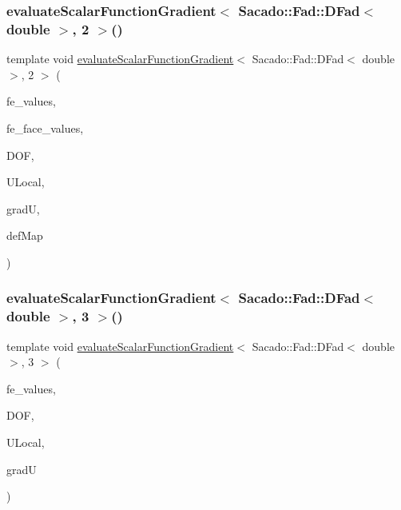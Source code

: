 \subsubsection{\texorpdfstring{evaluate\+Scalar\+Function\+Gradient$<$ Sacado\+::\+Fad\+::\+D\+Fad$<$ double $>$, 2 $>$()}{evaluateScalarFunctionGradient< Sacado::Fad::DFad< double >, 2 >()}\hspace{0.1cm}{\footnotesize\ttfamily [4/4]}}
{\footnotesize\ttfamily template void \mbox{\hyperlink{group___evaluation_functions_gabedd4ae2841d2332ed0df0513b189e34}{evaluate\+Scalar\+Function\+Gradient}}$<$ Sacado\+::\+Fad\+::\+D\+Fad$<$ double $>$, 2 $>$ (\begin{DoxyParamCaption}\item[{const F\+E\+Values$<$ 2 $>$ \&}]{fe\+\_\+values,  }\item[{const F\+E\+Face\+Values$<$ 2 $>$ \&}]{fe\+\_\+face\+\_\+values,  }\item[{unsigned int}]{D\+OF,  }\item[{Table$<$ 1, Sacado\+::\+Fad\+::\+D\+Fad$<$ double $>$$>$ \&}]{U\+Local,  }\item[{Table$<$ 2, Sacado\+::\+Fad\+::\+D\+Fad$<$ double $>$$>$ \&}]{gradU,  }\item[{\mbox{\hyperlink{structdeformation_map}{deformation\+Map}}$<$ Sacado\+::\+Fad\+::\+D\+Fad$<$ double $>$, 2 $>$ \&}]{def\+Map }\end{DoxyParamCaption})}

\mbox{\label{function_evaluations_8cc_a612155392eef7fae67e40615ddfce82a}} 
\subsubsection{\texorpdfstring{evaluate\+Scalar\+Function\+Gradient$<$ Sacado\+::\+Fad\+::\+D\+Fad$<$ double $>$, 3 $>$()}{evaluateScalarFunctionGradient< Sacado::Fad::DFad< double >, 3 >()}\hspace{0.1cm}{\footnotesize\ttfamily [1/4]}}
{\footnotesize\ttfamily template void \mbox{\hyperlink{group___evaluation_functions_gabedd4ae2841d2332ed0df0513b189e34}{evaluate\+Scalar\+Function\+Gradient}}$<$ Sacado\+::\+Fad\+::\+D\+Fad$<$ double $>$, 3 $>$ (\begin{DoxyParamCaption}\item[{const F\+E\+Values$<$ 3 $>$ \&}]{fe\+\_\+values,  }\item[{unsigned int}]{D\+OF,  }\item[{Table$<$ 1, Sacado\+::\+Fad\+::\+D\+Fad$<$ double $>$$>$ \&}]{U\+Local,  }\item[{Table$<$ 2, Sacado\+::\+Fad\+::\+D\+Fad$<$ double $>$$>$ \&}]{gradU }\end{DoxyParamCaption})}

